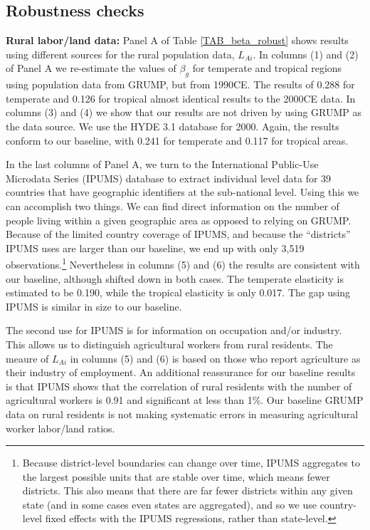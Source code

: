 \documentclass[11pt]{article}
\begin{document}
\subsection{Robustness checks}
\noindent\textbf{Rural labor/land data:} Panel A of Table \ref{TAB_beta_robust} shows results using different sources for the rural population data, $L_{Ai}$. In columns (1) and (2) of Panel A we re-estimate the values of $\beta_g$ for temperate and tropical regions using population data from GRUMP, but from 1990CE. The results of 0.288 for temperate and 0.126 for tropical almost identical results to the 2000CE data. In columns (3) and (4) we show that our results are not driven by using GRUMP as the data source. We use the HYDE 3.1 database \citep{hyde31} for 2000. Again, the results conform to our baseline, with 0.241 for temperate and 0.117 for tropical areas. 

In the last columns of Panel A, we turn to the International Public-Use Microdata Series (IPUMS) database \nocite{ipums} to extract individual level data for 39 countries that have geographic identifiers at the sub-national level. Using this we can accomplish two things. We can find direct information on the number of people living within a given geographic area as opposed to relying on GRUMP. Because of the limited country coverage of IPUMS, and because the ``districts'' IPUMS uses are larger than our baseline, we end up with only 3,519 observations.\footnote{Because district-level boundaries can change over time, IPUMS aggregates to the largest possible units that are stable over time, which means fewer districts. This also means that there are far fewer districts within any given state (and in some cases even states are aggregated), and so we use country-level fixed effects with the IPUMS regressions, rather than state-level.} Nevertheless in columns (5) and (6) the results are consistent with our baseline, although shifted down in both cases. The temperate elasticity is estimated to be 0.190, while the tropical elasticity is only 0.017. The gap using IPUMS is similar in size to our baseline.

The second use for IPUMS is for information on occupation and/or industry. This allows us to distinguish agricultural workers from rural residents. The meaure of $L_{Ai}$ in columns (5) and (6) is based on those who report agriculture as their industry of employment. An additional reassurance for our baseline results is that IPUMS shows that the correlation of rural residents with the number of agricultural workers is 0.91 and significant at less than 1\%. Our baseline GRUMP data on rural residents is not making systematic errors in measuring agricultural worker labor/land ratios.
\end{document}
